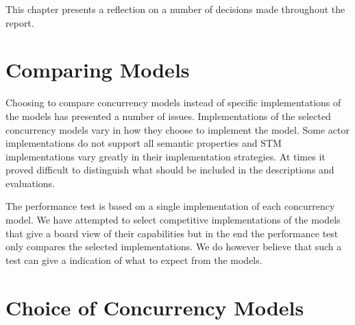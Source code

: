 \makeatletter {}\makeatother
{}
This chapter presents a reflection on a number of decisions made throughout the report.

\section{Comparing Models}
Choosing to compare concurrency models instead of specific implementations of the models has presented a number of issues. Implementations of the selected concurrency models vary in how they choose to implement the model. Some actor implementations do not support all semantic properties and \ac{STM} implementations vary greatly in their implementation strategies. At times it proved difficult to distinguish what should be included in the descriptions and evaluations. 

The performance test is based on a single implementation of each concurrency model. We have attempted to select competitive implementations of the models that give a board view of their capabilities but in the end the performance test only compares the selected implementations. We do however believe that such a test can give a indication of what to expect from the models.

\section{Choice of Concurrency Models}


